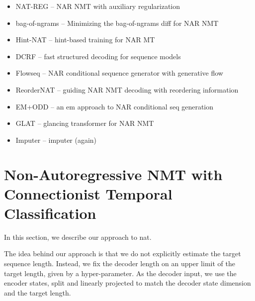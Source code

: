 



\begin{itemize}
\item NAT-REG \citep{wang2019nonautoregressive} -- NAR NMT with auxiliary regularization
\item bag-of-ngrams \citep{shao2020minimizing} -- Minimizing the bag-of-ngrams diff for NAR NMT
\item Hint-NAT \citep{li2019hint} -- hint-based training for NAR MT
\item DCRF \citep{sun2019fast} -- fast structured decoding for sequence models
\item Flowseq \citep{ma2019flowseq} -- NAR conditional sequence generator with generative flow
\item ReorderNAT \citep{ran2019guiding} -- guiding NAR NMT decoding with reordering information
\item EM+ODD \citep{sun2020em} -- an em approach to NAR conditional seq generation
\item GLAT \citep{qian2020glancing} -- glancing transformer for NAR NMT
\item Imputer \citep{saharia2020nonautoregressive} -- imputer (again)
\end{itemize}

\section{Non-Autoregressive NMT with Connectionist Temporal Classification}
\label{sec:nat-ctc}


In this section, we describe our approach to \acl{nat}.

The idea behind our approach is that we do not explicitly estimate the target
sequence length. Instead, we fix the decoder length on an upper limit of the
target length, given by a hyper-parameter. As the decoder input, we use the
encoder states, split and linearly projected to match the decoder state
dimension and the target length.

